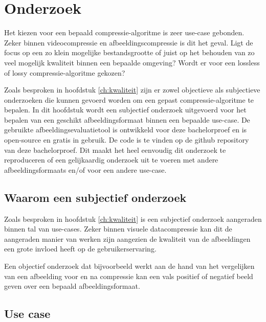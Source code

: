 \chapter{Onderzoek}
\label{ch:onderzoek}

Het kiezen voor een bepaald \gls{compressie-algoritme} is zeer \gls{use-case} gebonden. Zeker binnen \gls{videocompressie} en \gls{afbeeldingscompressie} is dit het geval. Ligt de focus op een zo klein mogelijke bestandsgrootte of juist op het behouden van zo veel mogelijk kwaliteit binnen een bepaalde omgeving? Wordt er voor een \gls{lossless} of \gls{lossy} \gls{compressie-algoritme} gekozen?

Zoals besproken in hoofdstuk \ref{ch:kwaliteit} zijn er zowel objectieve als subjectieve onderzoeken die kunnen gevoerd worden om een gepast \gls{compressie-algoritme} te bepalen. In dit hoofdstuk wordt een subjectief onderzoek uitgevoerd voor het bepalen van een geschikt \gls{afbeeldingsformaat} binnen een bepaalde \gls{use-case}. De gebruikte \gls{afbeeldingsevaluatietool} is ontwikkeld voor deze bachelorproef en is \gls{open-source} en gratis in gebruik. De code is te vinden op de \gls{github} repository van deze bachelorproef. Dit maakt het heel eenvoudig dit onderzoek te reproduceren of een gelijkaardig onderzoek uit te voeren met andere \glspl{afbeeldingsformaat} en/of voor een andere \gls{use-case}.


\section{Waarom een subjectief onderzoek}
\label{sec:onderzoek-waarom-subjectief}

Zoals besproken in hoofdstuk \ref{ch:kwaliteit} is een subjectief onderzoek aangeraden binnen tal van \glspl{use-case}. Zeker binnen visuele \gls{datacompressie} kan dit de aangeraden manier van werken zijn aangezien de kwaliteit van de afbeeldingen een grote invloed heeft op de gebruikerservaring. 

Een objectief onderzoek dat bijvoorbeeld werkt aan de hand van het vergelijken van een afbeelding voor en na compressie kan een vals positief of negatief beeld geven over een bepaald \gls{afbeeldingsformaat}.

\section{Use case}
\label{sec:onderzoek-use-case}

